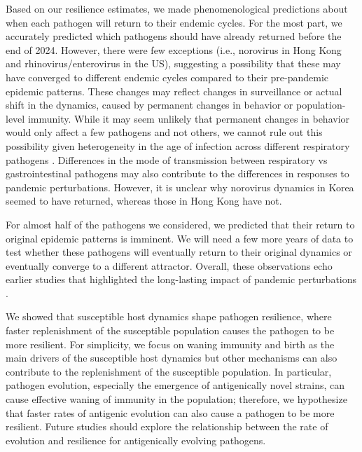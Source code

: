 \documentclass[12pt]{article}
\begin{document}
Based on our resilience estimates, we made phenomenological predictions about when each pathogen will return to their endemic cycles.
For the most part, we accurately predicted which pathogens should have already returned before the end of 2024.
However, there were few exceptions (i.e., norovirus in Hong Kong and rhinovirus/enterovirus in the US), suggesting a possibility that these may have converged to different endemic cycles compared to their pre-pandemic epidemic patterns.
These changes may reflect changes in surveillance or actual shift in the dynamics, caused by permanent changes in behavior or population-level immunity.
While it may seem unlikely that permanent changes in behavior would only affect a few pathogens and not others, we cannot rule out this possibility given heterogeneity in the age of infection across different respiratory pathogens \citep{radin2014epidemiology,lv2024epidemiological}.
Differences in the mode of transmission between respiratory vs gastrointestinal pathogens may also contribute to the differences in responses to pandemic perturbations.
However, it is unclear why norovirus dynamics in Korea seemed to have returned, whereas those in Hong Kong have not.

For almost half of the pathogens we considered, we predicted that their return to original epidemic patterns is imminent.
We will need a few more years of data to test whether these pathogens will eventually return to their original dynamics or eventually converge to a different attractor.
Overall, these observations echo earlier studies that highlighted the long-lasting impact of pandemic perturbations \citep{baker2022long,caini2024probable,chen2024covid,park2024predicting}. 

We showed that susceptible host dynamics shape pathogen resilience, where faster replenishment of the susceptible population causes the pathogen to be more resilient.
For simplicity, we focus on waning immunity and birth as the main drivers of the susceptible host dynamics but other mechanisms can also contribute to the replenishment of the susceptible population.
In particular, pathogen evolution, especially the emergence of antigenically novel strains, can cause effective waning of immunity in the population;
therefore, we hypothesize that faster rates of antigenic evolution can also cause a pathogen to be more resilient.
Future studies should explore the relationship between the rate of evolution and resilience for antigenically evolving pathogens.
\end{document}
